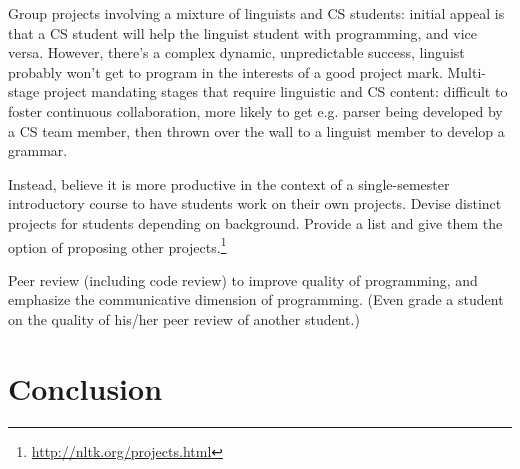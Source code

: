 \documentclass[11pt]{article}
\begin{document}
Group projects involving a mixture of linguists and CS students:
initial appeal is that a CS student will help the linguist student with programming,
and vice versa.  However, there's a
complex dynamic, unpredictable success, linguist probably won't get to program
in the interests of a good project mark.
Multi-stage project mandating stages that require linguistic and CS content: difficult
to foster continuous collaboration, more likely to get e.g. parser being developed by
a CS team member, then thrown over the wall to a linguist member to develop a grammar.

Instead, believe it is more productive in the context of a single-semester introductory
course to have students work on their own projects.  Devise distinct projects for
students depending on background.  Provide a list and give them the option of proposing
other projects.\footnote{\url{http://nltk.org/projects.html}}

Peer review (including code review) to improve quality of programming, and
emphasize the communicative dimension of programming.
(Even grade a student on the quality of his/her peer review of another student.)

\section{Conclusion}




\end{document}
